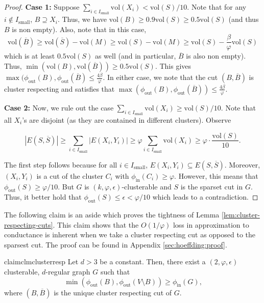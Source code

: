 \documentclass[letterpaper,11pt]{article}
\theoremstyle{plain}
\theoremstyle{definition}
\theoremstyle{remark}
\newcommand{\e}{\epsilon}
\newcommand{\vol}{\text{vol}}
\begin{document}
\begin{proof}
	\textbf{Case 1:}  Suppose $\sum_{i \in I_{\text{small}}} \vol(X_i) < \vol(S)/10$.
	Note that for any $i \not\in I_{\text{small}}$, $B \supseteq X_i$. Thus, we have
	$\vol(B) \geq 0.9\vol(S) \geq 0.5\vol(S)$ (and thus $B$ is non empty). Also, note that in this case, 
	$$\vol(\overline{B}) \geq \vol(\overline{S}) - \vol(M) \geq \vol(S) - \vol(M) \geq \vol(S) - \frac{\beta}{\varphi} \vol(S)$$
	which is at least $0.5 \vol(S)$ as well (and in particular, $\overline{B}$ is also non empty). 
	Thus, $\min(\vol(B), \vol(\overline{B})) \geq 0.5 \vol(S)$.
	This gives $\max(\phi_{\text{out}}(B), \phi_{\text{out}}(\overline{B}) \leq \frac{4 \beta}{\varphi}$.
	In either case, we note that the cut $(B, \overline{B})$ is cluster respecting and satisfies that
	$\max(\phi_{\text{out}}(B), \phi_{\text{out}}(\overline{B})) \leq \frac{4 \beta}{\varphi}$.



	\textbf{Case 2:} Now, we rule out the case $\sum_{i \in I_{\text{small}}} \vol(X_i) \geq \vol(S)/10$. 
	Note that all $X_i$'s are disjoint (as they are contained in different
	clusters). Observe

	$$|E(S, \overline{S})| \geq \sum_{i \in I_{\text{small}}} |E(X_i, Y_i)| \geq \varphi \sum_{i \in I_{\text{small}}} \vol(X_i) \geq \varphi \cdot \frac{\vol(S)}{10}.$$

	The first step follows because for all $i \in I_{\text{small}}$,  $E(X_i, Y_i) \subseteq E(S, \overline{S})$. 
	Moreover, $(X_i, Y_i)$ is a cut of the cluster $C_i$ with $\phi_{\text{in}}(C_i) \geq \varphi$.
	However, this means that $\phi_{\text{out}}(S) \geq \varphi/10$. But $G$ is $(k, \varphi, \e)$-clusterable
	and $S$ is the sparset cut in $G$. Thus, it better hold that $\phi_{\text{out}}(S) \leq \e < \varphi/10$ 
	which leads to a contradiction.
\end{proof}



The following claim is an aside which proves the tightness of Lemma \ref{lem:cluster-respecting-cuts}.
This claim shows that the $O(1/\varphi)$ loss in approximation to conductance is inherent when we 
take a cluster respecting cut as opposed to the sparsest cut. The proof can be found in 
Appendix \ref{sec:hoeffding:proof}.

\begin{restatable}{claim}{clmclusterresp} \label{clm:cluster:resp:lb}
	Let $d > 3$ be a constant. 
	Then, there exist a $(2, \varphi, \e)$ clusterable, $d$-regular graph $G$ such that
\[\min \left(\phi_{\text{out}}(B), \phi_{\text{out}}(V\setminus B) \right) \geq \phi_{\text{in}}(G) \text{,}\]
	where $(B, \overline{B})$ is the unique cluster respecting cut of $G$.
\end{restatable}
\end{document}

